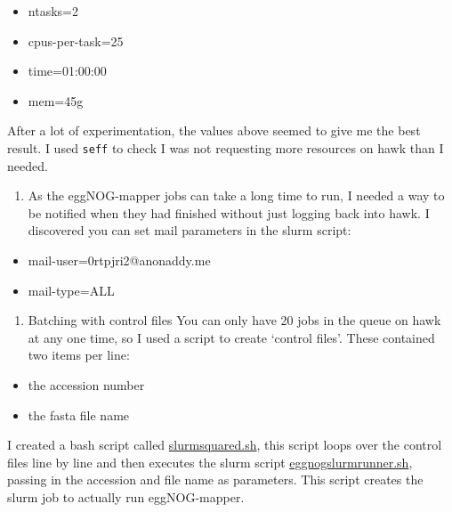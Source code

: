 \documentclass[
  letterpaper,
  DIV=11,
  numbers=noendperiod]{scrreprt}
\providecommand{\tightlist}{%
  \setlength{\itemsep}{0pt}\setlength{\parskip}{0pt}}\usepackage{longtable,booktabs,array}
\begin{document}
\begin{itemize}
\tightlist
\item
  ntasks=2\\
\item
  cpus-per-task=25\\
\item
  time=01:00:00\\
\item
  mem=45g
\end{itemize}

After a lot of experimentation, the values above seemed to give me the
best result. I used \texttt{seff} to check I was not requesting more
resources on hawk than I needed.

\begin{enumerate}
\def\labelenumi{\arabic{enumi}.}
\setcounter{enumi}{1}
\tightlist
\item
  As the eggNOG-mapper jobs can take a long time to run, I needed a way
  to be notified when they had finished without just logging back into
  hawk. I discovered you can set mail parameters in the slurm script:
\end{enumerate}

\begin{itemize}
\tightlist
\item
  mail-user=0rtpjri2@anonaddy.me
\item
  mail-type=ALL
\end{itemize}

\begin{enumerate}
\def\labelenumi{\arabic{enumi}.}
\setcounter{enumi}{2}
\tightlist
\item
  Batching with control files You can only have 20 jobs in the queue on
  hawk at any one time, so I used a script to create `control files'.
  These contained two items per line:
\end{enumerate}

\begin{itemize}
\tightlist
\item
  the accession number
\item
  the fasta file name
\end{itemize}

I created a bash script called
\href{https://github.com/tobiasnunn/tnunn_research/blob/main/Research_Experience_Module/00_scripts/Slurmscripts/slurmsquared.sh}{slurmsquared.sh},
this script loops over the control files line by line and then executes
the slurm script
\href{https://github.com/tobiasnunn/tnunn_research/blob/main/Research_Experience_Module/00_scripts/Slurmscripts/eggnogslurmrunner.sh}{eggnogslurmrunner.sh},
passing in the accession and file name as parameters. This script
creates the slurm job to actually run eggNOG-mapper.
\end{document}
